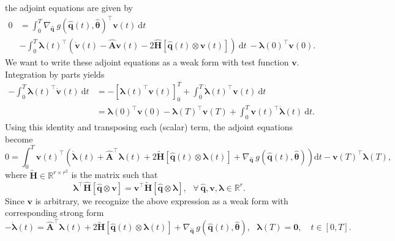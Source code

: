 the adjoint equations are given by\\
\begin{align*}
    0 &= \int_0^T \nabla_{\hat{\mathbf{q}}}~g(\hat{\mathbf{q}}(t),\hat{\bm{\theta}})^{\top}\mathbf{v}(t)~\mathrm{d}t\\
    &- \int_0^T \bm{\lambda}(t)^{\top} \left( \dot{\mathbf{v}}(t) - \hat{\mathbf{A}}\mathbf{v}(t) - 2\hat{\mathbf{H}}[\hat{\mathbf{q}}(t)\otimes \mathbf{v}(t)] \right)~\mathrm{d}t~- \bm{\lambda}(0)^{\top}\mathbf{v}(0). 
\end{align*}
We want to write these adjoint equations as a weak form with test function $\mathbf{v}$. Integration by parts yields\\
\begin{align*}
    -\int_0^T\bm{\lambda}(t)^{\top} \dot{\mathbf{v}}(t)~\mathrm{d}t &= -\left[ \bm{\lambda}(t)^{\top} \mathbf{v}(t) \right]_0^T + \int_0^T \dot{\bm{\lambda}}(t)^{\top}\mathbf{v}(t)~\mathrm{d}t\\
    &= \bm{\lambda}(0)^{\top} \mathbf{v}(0) - \bm{\lambda}(T)^{\top} \mathbf{v}(T) + \int_0^T \mathbf{v}(t)^{\top}\dot{\bm{\lambda}}(t)~\mathrm{d}t.
\end{align*}
Using this identity and transposing each (scalar) term, the adjoint equations become\\
\begin{equation*}
    0 = \int_0^T \mathbf{v}(t)^{\top} \left( \dot{\bm{\lambda}}(t) + \hat{\mathbf{A}}^{\top} \bm{\lambda}(t) + 2\tilde{\mathbf{H}}[\hat{\mathbf{q}}(t)\otimes \bm{\lambda}(t)] + \nabla_{\hat{\mathbf{q}}}~g(\hat{\mathbf{q}}(t),\hat{\bm{\theta}}) \right)\mathrm{d}t - \mathbf{v}(T)^{\top}\bm{\lambda}(T), 
\end{equation*}
where $\tilde{\mathbf{H}}\in\mathbb{R}^{r\times r^2}$ is the matrix such that\\
$$\bm{\lambda}^{\top}\hat{\mathbf{H}}[\hat{\mathbf{q}}\otimes \mathbf{v}] = \mathbf{v}^{\top}\tilde{\mathbf{H}}[\hat{\mathbf{q}}\otimes \bm{\lambda}],~~~\forall~\hat{\mathbf{q}}, \mathbf{v}, \bm{\lambda} \in \mathbb{R}^r.$$
Since $\mathbf{v}$ is arbitrary, we recognize the above expression as a weak form with corresponding strong form\\
\begin{equation*}
    -\dot{\bm{\lambda}}(t) = \hat{\mathbf{A}}^{\top} \bm{\lambda}(t) + 2\tilde{\mathbf{H}}[\hat{\mathbf{q}}(t)\otimes \bm{\lambda}(t)] + \nabla_{\hat{\mathbf{q}}}~g(\hat{\mathbf{q}}(t),\hat{\bm{\theta}}),~~~\bm{\lambda}(T)=\bm{0},\quad t\in [0,T].
\end{equation*}
